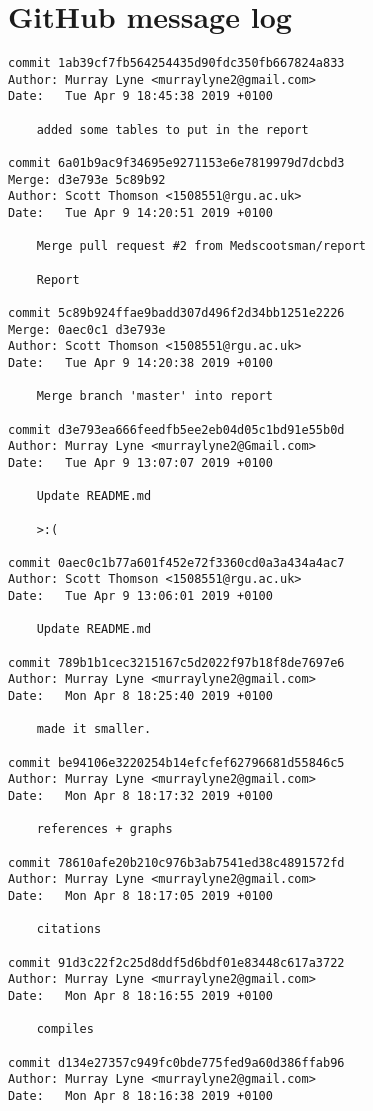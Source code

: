 \section{GitHub message log}
\label{sec:appendixGit}
\begin{lstlisting}
commit 1ab39cf7fb564254435d90fdc350fb667824a833
Author: Murray Lyne <murraylyne2@gmail.com>
Date:   Tue Apr 9 18:45:38 2019 +0100

    added some tables to put in the report

commit 6a01b9ac9f34695e9271153e6e7819979d7dcbd3
Merge: d3e793e 5c89b92
Author: Scott Thomson <1508551@rgu.ac.uk>
Date:   Tue Apr 9 14:20:51 2019 +0100

    Merge pull request #2 from Medscootsman/report
    
    Report

commit 5c89b924ffae9badd307d496f2d34bb1251e2226
Merge: 0aec0c1 d3e793e
Author: Scott Thomson <1508551@rgu.ac.uk>
Date:   Tue Apr 9 14:20:38 2019 +0100

    Merge branch 'master' into report

commit d3e793ea666feedfb5ee2eb04d05c1bd91e55b0d
Author: Murray Lyne <murraylyne2@Gmail.com>
Date:   Tue Apr 9 13:07:07 2019 +0100

    Update README.md
    
    >:(

commit 0aec0c1b77a601f452e72f3360cd0a3a434a4ac7
Author: Scott Thomson <1508551@rgu.ac.uk>
Date:   Tue Apr 9 13:06:01 2019 +0100

    Update README.md

commit 789b1b1cec3215167c5d2022f97b18f8de7697e6
Author: Murray Lyne <murraylyne2@gmail.com>
Date:   Mon Apr 8 18:25:40 2019 +0100

    made it smaller.

commit be94106e3220254b14efcfef62796681d55846c5
Author: Murray Lyne <murraylyne2@gmail.com>
Date:   Mon Apr 8 18:17:32 2019 +0100

    references + graphs

commit 78610afe20b210c976b3ab7541ed38c4891572fd
Author: Murray Lyne <murraylyne2@gmail.com>
Date:   Mon Apr 8 18:17:05 2019 +0100

    citations

commit 91d3c22f2c25d8ddf5d6bdf01e83448c617a3722
Author: Murray Lyne <murraylyne2@gmail.com>
Date:   Mon Apr 8 18:16:55 2019 +0100

    compiles

commit d134e27357c949fc0bde775fed9a60d386ffab96
Author: Murray Lyne <murraylyne2@gmail.com>
Date:   Mon Apr 8 18:16:38 2019 +0100


\end{lstlisting}
